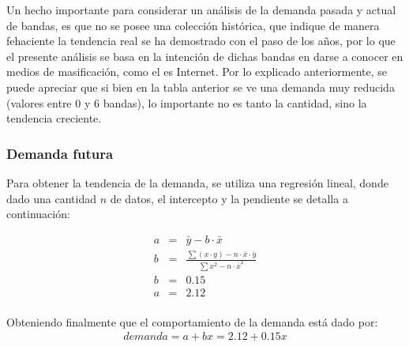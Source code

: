 Un hecho importante para considerar un análisis de la demanda pasada y actual de bandas, es que no se posee
una colección histórica, que indique de manera fehaciente la tendencia real se ha demostrado con el paso de los años,
por lo que el presente análisis se basa en la intención de dichas bandas en darse a conocer en medios de masificación, 
como el es Internet. Por lo explicado anteriormente, se puede apreciar que si bien en la tabla anterior se ve una demanda muy
reducida (valores entre 0 y 6 bandas), lo importante no es tanto la cantidad, sino la tendencia creciente.

\subsubsection{Demanda futura}

%
%

Para obtener la tendencia de la demanda, se utiliza una regresión lineal, donde dado una cantidad $n$ de datos, el intercepto y la pendiente se detalla a continuación:

\begin{eqnarray}
a &=& \bar{y} - b \cdot \bar{x}\\
b &=& \frac{\sum(x\cdot y) - n \cdot \bar{x} \cdot \bar{y}}{\sum x^2 - n \cdot \bar{x}^2}\\
b &=& 0.15 \nonumber\\
a &=& 2.12 \nonumber\\
\end{eqnarray}

Obteniendo finalmente que el comportamiento de la demanda está dado por:\\

\begin{eqnarray}
demanda = a + bx = 2.12 + 0.15x
\end{eqnarray}

